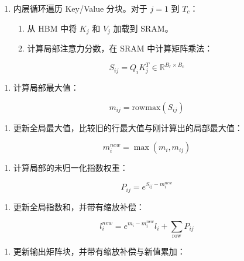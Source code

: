\begin{enumerate}
\def\labelenumi{\arabic{enumi}.}
\setcounter{enumi}{2}
\item
  内层循环遍历 Key/Value 分块。对于 \(j = 1\) 到 \(T_c\)：

  \begin{enumerate}
  \def\labelenumii{\arabic{enumii}.}
  \tightlist
  \item
    从 HBM 中将 \(K_j\) 和 \(V_j\) 加载到 SRAM。
  \item
    计算局部注意力分数，在 SRAM 中计算矩阵乘法：
  \end{enumerate}
\end{enumerate}

\[
S_{ij} = Q_iK_j^T \in \mathbb{R}^{B_r \times B_c}
\]

\begin{enumerate}
\def\labelenumi{\arabic{enumi}.}
\setcounter{enumi}{2}
\tightlist
\item
  计算局部最大值：
\end{enumerate}

\[
m_{ij} = \mathrm{rowmax}(S_{ij})
\]

\begin{enumerate}
\def\labelenumi{\arabic{enumi}.}
\setcounter{enumi}{3}
\tightlist
\item
  更新全局最大值，比较旧的行最大值与刚计算出的局部最大值：
\end{enumerate}

\[
m_i^{new} = \max(m_i,m_{ij})
\]

\begin{enumerate}
\def\labelenumi{\arabic{enumi}.}
\setcounter{enumi}{4}
\tightlist
\item
  计算局部的未归一化指数权重：
\end{enumerate}

\[
P_{ij} = e^{S_{ij}-m_i^{new}}
\]

\begin{enumerate}
\def\labelenumi{\arabic{enumi}.}
\setcounter{enumi}{5}
\tightlist
\item
  更新全局指数和，并带有缩放补偿：
\end{enumerate}

\[
l_i^{new} = e^{m_i-m_i^{new}}l_i + \sum_{\text{row}} P_{ij}
\]

\begin{enumerate}
\def\labelenumi{\arabic{enumi}.}
\setcounter{enumi}{6}
\tightlist
\item
  更新输出矩阵块，并带有缩放补偿与新值累加：
\end{enumerate}

